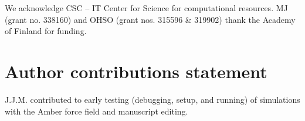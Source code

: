 \documentclass[journal=jctcce]{achemso}
\begin{document}
\begin{acknowledgement}
We acknowledge CSC -- IT Center for Science for computational resources.
%
%
MJ (grant no. 338160) and OHSO (grant nos. 315596 \& 319902) thank the Academy of Finland for funding.

\end{acknowledgement}

\section*{Author contributions statement}

J.J.M. contributed to early testing (debugging, setup, and running) of simulations with the Amber force field and manuscript editing.


\end{document}

